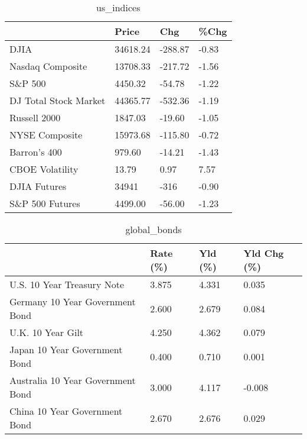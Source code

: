 \documentclass{article}%
\begin{document}
%


\begin{table}[htbp]%
\caption{us\_indices}%
\centering%
\begin{adjustbox}{width=1\textwidth}%
\begin{tabular}{llll}
\toprule
                      &    Price &     Chg &  \%Chg \\
\midrule
                 DJIA & 34618.24 & -288.87 & -0.83 \\
     Nasdaq Composite & 13708.33 & -217.72 & -1.56 \\
              S\&P 500 &  4450.32 &  -54.78 & -1.22 \\
DJ Total Stock Market & 44365.77 & -532.36 & -1.19 \\
         Russell 2000 &  1847.03 &  -19.60 & -1.05 \\
       NYSE Composite & 15973.68 & -115.80 & -0.72 \\
         Barron's 400 &   979.60 &  -14.21 & -1.43 \\
      CBOE Volatility &    13.79 &    0.97 &  7.57 \\
         DJIA Futures &    34941 &    -316 & -0.90 \\
      S\&P 500 Futures &  4499.00 &  -56.00 & -1.23 \\
\bottomrule
\end{tabular}
%
\end{adjustbox}%
\end{table}

%


\begin{table}[htbp]%
\caption{global\_bonds}%
\centering%
\begin{adjustbox}{width=1\textwidth}%
\begin{tabular}{llll}
\toprule
                                  & Rate (\%) & Yld (\%) & Yld Chg (\%) \\
\midrule
       U.S. 10 Year Treasury Note &    3.875 &   4.331 &       0.035 \\
  Germany 10 Year Government Bond &    2.600 &   2.679 &       0.084 \\
                U.K. 10 Year Gilt &    4.250 &   4.362 &       0.079 \\
    Japan 10 Year Government Bond &    0.400 &   0.710 &       0.001 \\
Australia 10 Year Government Bond &    3.000 &   4.117 &      -0.008 \\
    China 10 Year Government Bond &    2.670 &   2.676 &       0.029 \\
\bottomrule
\end{tabular}
%
\end{adjustbox}%
\end{table}
\end{document}
